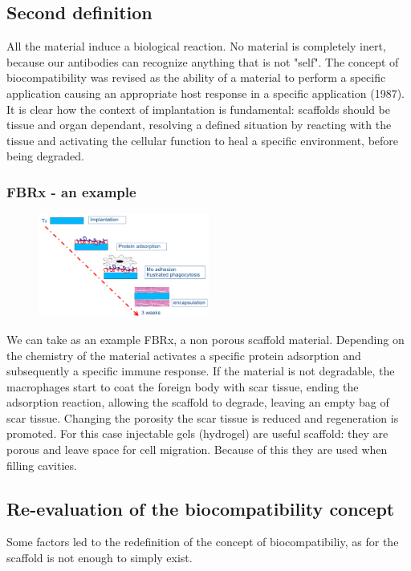 	\subsection{Second definition}
	All the material induce a biological reaction.
	No material is completely inert, because our antibodies can recognize anything that is not "self".
	The concept of biocompatibility was revised as the ability of a material to perform a specific application causing an appropriate host response in a specific application (1987).
	It is clear how the context of implantation is fundamental: scaffolds should be tissue and organ dependant, resolving a defined situation by reacting with the tissue and activating the cellular function to heal a specific environment, before being degraded.

		\subsubsection{FBRx - an example}

		\begin{figure}[ht]
			\centering
			\includegraphics[width=0.5\textwidth]{fbrx.png}
			\caption{\label{fig:matrixome}}
		\end{figure}

		We can take as an example FBRx, a non porous scaffold material.
		Depending on the chemistry of the material activates a specific protein adsorption and subsequently a specific immune response.
		If the material is not degradable, the macrophages start to coat the foreign body with scar tissue, ending the adsorption reaction, allowing the scaffold to degrade, leaving an empty bag of scar tissue.
		Changing the porosity the scar tissue is reduced and regeneration is promoted.
		For this case injectable gels (hydrogel) are useful scaffold: they are porous and leave space for cell migration.
		Because of this they are used when filling cavities.

	\subsection{Re-evaluation of the biocompatibility concept}
	Some factors led to the redefinition of the concept of biocompatibiliy, as for the scaffold is not enough to simply exist.

